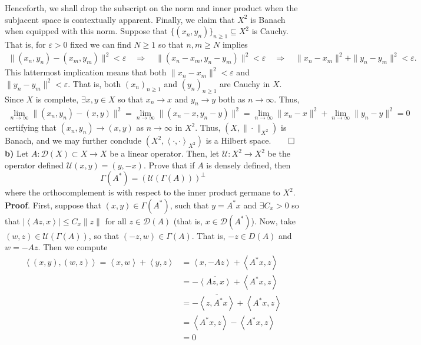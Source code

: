 \documentclass[10pt]{article}
\newcommand{\1}[1]{\mathbbm{1}_{#1}} \newcommand{\mc}[1]{\mathcal{#1}}
\newcommand{\ip}[2]{\left\langle#1,#2\right\rangle }
\begin{document}
    Henceforth, we shall drop the subscript on the norm and inner product when
    the subjacent space is contextually apparent. Finally, we claim that $X^2$ is Banach when equipped with this norm. 
    Suppose that $\{(x_n,y_n)\}_{n\geq 1}\subseteq X^2$ is Cauchy. That is, for $\varepsilon>0$ fixed we can find $N\geq 1$ so that $n,m\geq N$ implies
    \begin{align*}
        \|(x_n,y_n)-(x_m,y_m)\|^2<\varepsilon\quad\Rightarrow\quad \|(x_n-x_m, y_n-y_m)\|^2<\varepsilon\quad\Rightarrow\quad\|x_n-x_m\|^2+\|y_n-y_m\|^2<\varepsilon.
    \end{align*}
    This lattermost implication means that both $\|x_n-x_m\|^2<\varepsilon$ and $\|y_n-y_m\|^2<\varepsilon$. That is, both $(x_n)_{n\geq 1}$ and $(y_n)_{n\geq 1}$ are Cauchy in $X$.
    Since $X$ is complete, $\exists x,y\in X$ so that $x_n\rightarrow x$ and $y_n\rightarrow y$ both as $n\rightarrow\infty$. Thus,
    \begin{align*}
        \lim_{n\rightarrow\infty}\|(x_n,y_n)-(x,y)\|^2=\lim_{n\rightarrow\infty}\|(x_n-x,y_n-y)\|^2=\lim_{n\rightarrow\infty}\|x_n-x\|^2+\lim_{n\rightarrow\infty}\|y_n-y\|^2=0
    \end{align*}
    certifying that $(x_n,y_n)\rightarrow(x,y)$ as $n\rightarrow\infty$ in $X^2$. Thus, $(X,\|\cdot\|_{X^2})$ is Banach, and we may further conclude $(X^2,\ip{\cdot}{\cdot}_{X^2})$ is a Hilbert space.\hfill{$\qed$}\\[5pt]
    {\bf b)} Let $A:\mc{D}(X)\subset X\rightarrow X$ be a linear operator. Then, let $\mc{U}:X^2\rightarrow X^2$ be the operator defined $\mc{U}(x,y)=(y,-x)$. Prove that if $A$ is densely defined, then
    \[\Gamma(A^\ast)=(\mc{U}(\Gamma(A)))^\perp\]
    where the orthocomplement is with respect to the inner product germane to $X^2$.\\[5pt]
    {\bf Proof}. First, suppose that $(x,y)\in\Gamma(A^\ast)$, such that $y=A^\ast x$ and $\exists C_x>0$ so that $|\ip{Az}{x}|\leq C_x\|z\|$ for all $z\in\mc{D}(A)$ (that is, $x\in \mc{D}(A^\ast)$).
    Now, take $(w,z)\in\mc{U}(\Gamma(A))$, so that $(-z,w)\in\Gamma(A)$. That is, $-z\in D(A)$ and $w=-Az$. Then we compute
    \begin{align*}
        \ip{(x,y)}{(w,z)}=\ip{x}{w}+\ip{y}{z}&=\ip{x}{-Az}+\ip{A^\ast x}{z}\\
        &=-\overline{\ip{Az}{x}}+\ip{A^\ast x}{z}\\
        &=-\overline{\ip{z}{A^\ast x}}+\ip{A^\ast x}{z}\tag{1}\\
        &=\ip{A^\ast x}{z}-\ip{A^\ast x}{z}\\
        &=0
    \end{align*}
\end{document}
